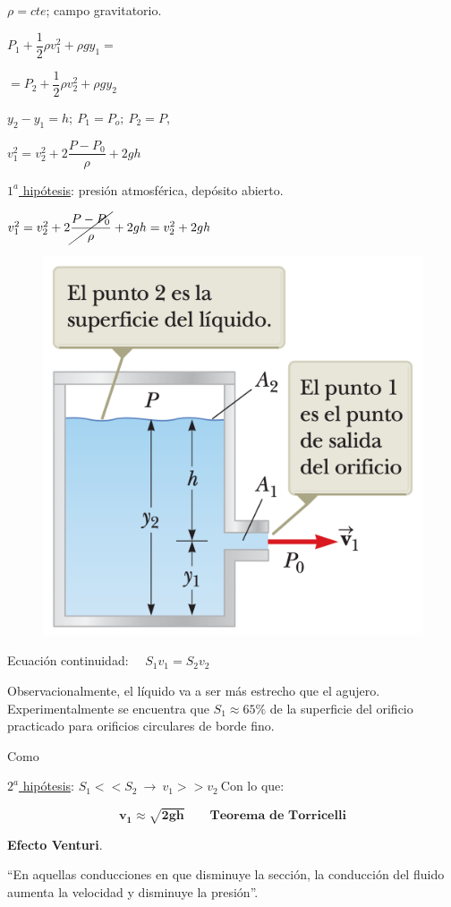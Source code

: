 \begin{multicols}{2}
$\rho = cte$; campo gravitatorio.

$P_1+\dfrac 1 2 \rho v_1^2 +\rho g y_1=$

$=P_2+\dfrac 1 2 \rho v_2^2 +\rho g y_2$

$y_2-y_1=h; \ P_1=P_o; \ P_2=P$, 

$v_1^2=v_2^2+2\dfrac{P-P_0}{\rho}+2gh$

\underline{$1^a$ hipótesis}: presión atmosférica, depósito abierto.

$v_1^2=v_2^2+2\cancel{\dfrac{P-P_0}{\rho}}+2gh =v_2^2+2gh$
\begin{figure}[H]
	\centering
	\includegraphics[width=.5\textwidth]{imagenes/imagenes18/T18IM08.png}
	\end{figure}	
\end{multicols}

Ecuación continuidad: $\quad S_1v_1=S_2v_2$

Observacionalmente, el líquido va a ser más estrecho que el agujero. Experimentalmente se encuentra que $S_1\approx 65\%$ de la superficie del orificio practicado para orificios circulares de borde fino. 

Como

 \underline{$2^a$ hipótesis}: $S_1<<S_2 \ \to \ v_1>>v_2 \ $Con lo que:
 
 \begin{equation}
 \boldsymbol{ v_1 \approx \sqrt{2gh}	 } \qquad  \textbf{Teorema de Torricelli}
 \end{equation}
 
\vspace{10mm} %
 
\textbf{\large{Efecto Venturi}}\normalsize{.}

\begin{miparrafodestacado}
``En aquellas conducciones en que disminuye la sección, la conducción del fluido aumenta la velocidad y disminuye la presión''.	
\end{miparrafodestacado}

